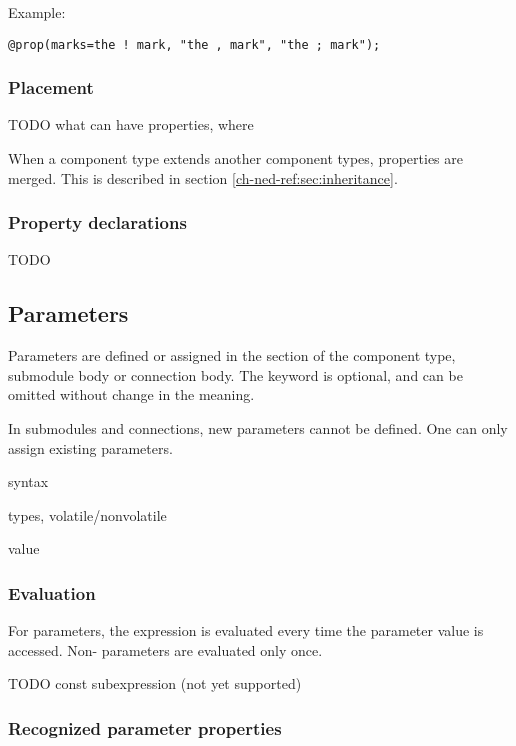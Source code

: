 Example:

\begin{verbatim}
@prop(marks=the ! mark, "the , mark", "the ; mark");
\end{verbatim}


\subsubsection{Placement}

TODO what can have properties, where

When a component type extends another component types, properties
are merged. This is described in section \ref{ch-ned-ref:sec:inheritance}.

\subsubsection{Property declarations}

TODO


\subsection{Parameters}
\label{ch-ned-ref:sec:parameters}

Parameters are defined or assigned in the  section
of the component type, submodule body or connection body.
The  keyword is optional, and can be omitted
without change in the meaning.

In submodules and connections, new parameters cannot be defined. One can
only assign existing parameters.

syntax

types, volatile/nonvolatile

value

\subsubsection{Evaluation}

For  parameters, the expression is evaluated every time the
parameter value is accessed. Non- parameters are evaluated only once.

TODO const subexpression (not yet supported)

\subsubsection{Recognized parameter properties}

